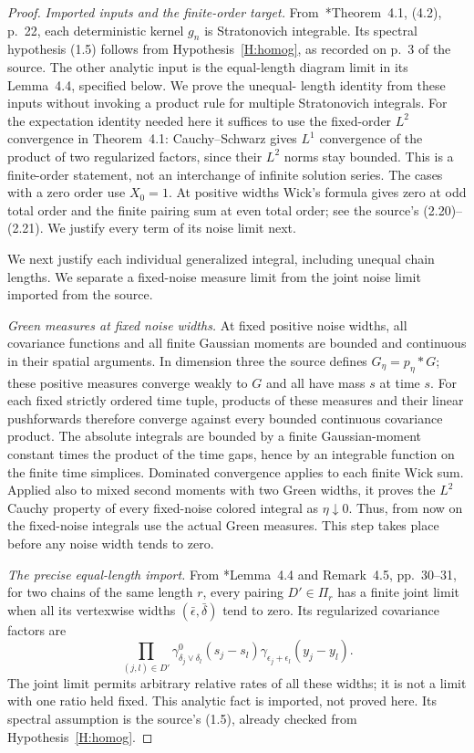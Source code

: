 \begin{proof}
\emph{Imported inputs and the finite-order target.}
From~\cite{chen:author2026:time-dependency}*{Theorem~4.1, (4.2), p.~22}, each
deterministic kernel $g_n$ is Stratonovich integrable. Its spectral
hypothesis (1.5) follows from Hypothesis~\ref{H:homog}, as recorded
on p.~3 of the source. The other analytic input is the equal-length
diagram limit in its Lemma~4.4, specified below. We prove the unequal-
length identity from these inputs without invoking a product rule for
multiple Stratonovich integrals.
For the expectation identity needed here it suffices to use the fixed-order
$L^2$ convergence in Theorem~4.1: Cauchy--Schwarz gives $L^1$ convergence
of the product of two regularized factors, since their $L^2$ norms stay
bounded. This is a finite-order statement, not an interchange of infinite
solution series. The cases with a zero order use $X_0=1$.
At positive widths Wick's formula gives zero at odd total order and
the finite pairing sum at even total order; see the source's
(2.20)--(2.21). We justify every term of its noise limit next.

We next justify each individual generalized integral, including unequal
chain lengths. We separate a fixed-noise measure limit from the joint
noise limit imported from the source.

\emph{Green measures at fixed noise widths.}
At fixed positive noise widths, all covariance functions and all finite
Gaussian moments are bounded and continuous in their spatial arguments.
In dimension three the source defines $G_\eta=p_\eta*G$; these positive
measures converge weakly to $G$ and all have mass $s$ at time $s$.
For each fixed strictly ordered time tuple, products of these measures
and their linear pushforwards therefore converge against every bounded
continuous covariance product. The absolute integrals are bounded by
a finite Gaussian-moment constant times the product of the time gaps,
hence by an integrable function on the finite time simplices. Dominated
convergence applies to each finite Wick sum. Applied also to mixed
second moments with two Green widths, it proves the $L^2$ Cauchy
property of every fixed-noise colored integral as $\eta\downarrow0$.
Thus, from now on the fixed-noise integrals use the actual Green
measures. This step takes place before any noise width tends to zero.

\emph{The precise equal-length import.}
From
\cite{chen:author2026:time-dependency}*{Lemma~4.4 and Remark~4.5,
pp.~30--31}, for two chains of the same length $r$, every pairing
$D'\in\Pi_r$ has a finite joint limit when all its vertexwise widths
$(\bar\epsilon,\bar\delta)$ tend to zero. Its regularized covariance
factors are
\[
  \prod_{(j,l)\in D'}
  \gamma^0_{\delta_j\vee\delta_l}(s_j-s_l)
  \gamma_{\epsilon_j+\epsilon_l}(y_j-y_l).
\]
The joint limit permits arbitrary relative rates of all these widths;
it is not a limit with one ratio held fixed. This analytic fact is
imported, not proved here. Its spectral assumption is the source's
(1.5), already checked from Hypothesis~\ref{H:homog}.


\end{proof}
